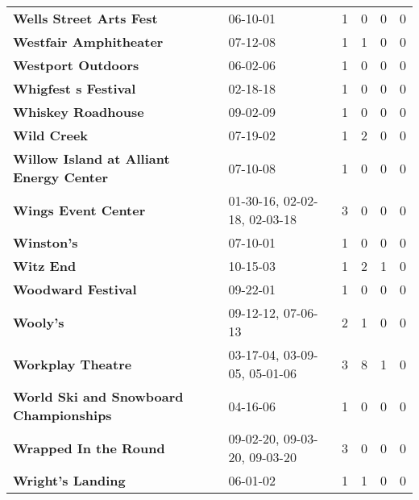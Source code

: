 \begin{supertabular}{llllll}
                                      \textbf{Wells Street Arts Fest} &                      06-10-01 &  1 &   0 &  0 &  0 \\
                                       \textbf{Westfair Amphitheater} &                      07-12-08 &  1 &   1 &  0 &  0 \\
                                           \textbf{Westport Outdoors} &                      06-02-06 &  1 &   0 &  0 &  0 \\
                                         \textbf{Whigfest s Festival} &                      02-18-18 &  1 &   0 &  0 &  0 \\
                                           \textbf{Whiskey Roadhouse} &                      09-02-09 &  1 &   0 &  0 &  0 \\
                                                  \textbf{Wild Creek} &                      07-19-02 &  1 &   2 &  0 &  0 \\
                      \textbf{Willow Island at Alliant Energy Center} &                      07-10-08 &  1 &   0 &  0 &  0 \\
                                          \textbf{Wings Event Center} &  01-30-16, 02-02-18, 02-03-18 &  3 &   0 &  0 &  0 \\
                                                   \textbf{Winston's} &                      07-10-01 &  1 &   0 &  0 &  0 \\
                                                    \textbf{Witz End} &                      10-15-03 &  1 &   2 &  1 &  0 \\
                                           \textbf{Woodward Festival} &                      09-22-01 &  1 &   0 &  0 &  0 \\
                                                     \textbf{Wooly's} &            09-12-12, 07-06-13 &  2 &   1 &  0 &  0 \\
                                            \textbf{Workplay Theatre} &  03-17-04, 03-09-05, 05-01-06 &  3 &   8 &  1 &  0 \\
                       \textbf{World Ski and Snowboard Championships} &                      04-16-06 &  1 &   0 &  0 &  0 \\
                                        \textbf{Wrapped In the Round} &  09-02-20, 09-03-20, 09-03-20 &  3 &   0 &  0 &  0 \\
                                            \textbf{Wright's Landing} &                      06-01-02 &  1 &   1 &  0 &  0 \\

\end{supertabular}
